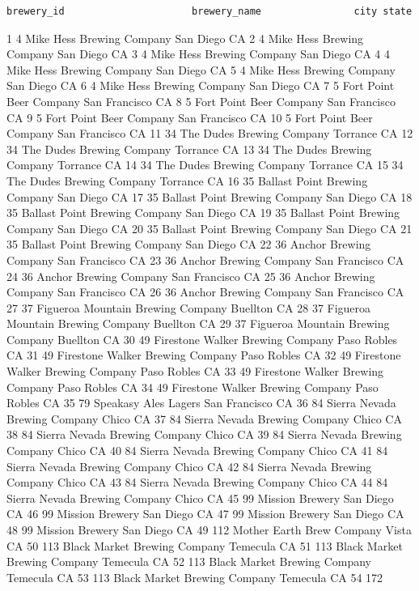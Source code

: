 \documentclass[]{article}
\begin{document}
\begin{verbatim}
brewery_id                      brewery_name                city state
\end{verbatim}

1 4 Mike Hess Brewing Company San Diego CA 2 4 Mike Hess Brewing Company
San Diego CA 3 4 Mike Hess Brewing Company San Diego CA 4 4 Mike Hess
Brewing Company San Diego CA 5 4 Mike Hess Brewing Company San Diego CA
6 4 Mike Hess Brewing Company San Diego CA 7 5 Fort Point Beer Company
San Francisco CA 8 5 Fort Point Beer Company San Francisco CA 9 5 Fort
Point Beer Company San Francisco CA 10 5 Fort Point Beer Company San
Francisco CA 11 34 The Dudes Brewing Company Torrance CA 12 34 The Dudes
Brewing Company Torrance CA 13 34 The Dudes Brewing Company Torrance CA
14 34 The Dudes Brewing Company Torrance CA 15 34 The Dudes Brewing
Company Torrance CA 16 35 Ballast Point Brewing Company San Diego CA 17
35 Ballast Point Brewing Company San Diego CA 18 35 Ballast Point
Brewing Company San Diego CA 19 35 Ballast Point Brewing Company San
Diego CA 20 35 Ballast Point Brewing Company San Diego CA 21 35 Ballast
Point Brewing Company San Diego CA 22 36 Anchor Brewing Company San
Francisco CA 23 36 Anchor Brewing Company San Francisco CA 24 36 Anchor
Brewing Company San Francisco CA 25 36 Anchor Brewing Company San
Francisco CA 26 36 Anchor Brewing Company San Francisco CA 27 37
Figueroa Mountain Brewing Company Buellton CA 28 37 Figueroa Mountain
Brewing Company Buellton CA 29 37 Figueroa Mountain Brewing Company
Buellton CA 30 49 Firestone Walker Brewing Company Paso Robles CA 31 49
Firestone Walker Brewing Company Paso Robles CA 32 49 Firestone Walker
Brewing Company Paso Robles CA 33 49 Firestone Walker Brewing Company
Paso Robles CA 34 49 Firestone Walker Brewing Company Paso Robles CA 35
79 Speakasy Ales Lagers San Francisco CA 36 84 Sierra Nevada Brewing
Company Chico CA 37 84 Sierra Nevada Brewing Company Chico CA 38 84
Sierra Nevada Brewing Company Chico CA 39 84 Sierra Nevada Brewing
Company Chico CA 40 84 Sierra Nevada Brewing Company Chico CA 41 84
Sierra Nevada Brewing Company Chico CA 42 84 Sierra Nevada Brewing
Company Chico CA 43 84 Sierra Nevada Brewing Company Chico CA 44 84
Sierra Nevada Brewing Company Chico CA 45 99 Mission Brewery San Diego
CA 46 99 Mission Brewery San Diego CA 47 99 Mission Brewery San Diego CA
48 99 Mission Brewery San Diego CA 49 112 Mother Earth Brew Company
Vista CA 50 113 Black Market Brewing Company Temecula CA 51 113 Black
Market Brewing Company Temecula CA 52 113 Black Market Brewing Company
Temecula CA 53 113 Black Market Brewing Company Temecula CA 54 172
\end{document}
